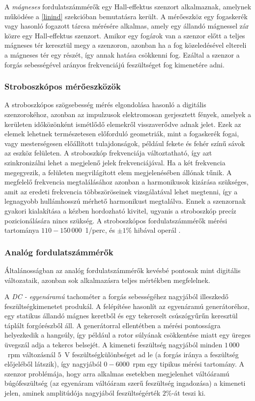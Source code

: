 A \textit{mágneses} fordulatszámmérők egy Hall-effektus szenzort alkalmaznak, amelynek működése a \ref{linind} szekcióban bemutatásra került. A mérőeszköz egy fogaskerék vagy hasonló fogazott tárcsa mérésére alkalmas, amely egy állandó mágnessel zár közre egy Hall-effektus szenzort. Amikor egy fogárok van a szenzor előtt a teljes mágneses tér keresztül megy a szenzoron, azonban ha a fog közeledésével eltereli a mágneses tér egy részét, így annak hatása csökkenni fog. Ezáltal a szenzor a forgás sebességével arányos frekvenciájú feszültséget fog kimenetére adni.

\subsubsection{Stroboszkópos mérőeszközök}

A stroboszkópos szögsebesség mérés elgondolása hasonló a digitális szenzorokéhoz, azonban az impulzusok elektromosan gerjesztett fények, amelyek a kerületen időközönként ismétlődő elemekről visszaverődve adnak jelet. Ezek az elemek lehetnek természetesen előforduló geometriák, mint a fogaskerék fogai, vagy mesterségesen előállított tulajdonságok, például fekete és fehér színű sávok az eszköz felületen. A stroboszkóp frekvenciája változtatható, így azt szinkronizálni lehet a megjelenő jelek frekvenciájával. Ha a két frekvencia megegyezik, a felületen megvilágított elem megjelenésében állónak tűnik. A megfelelő frekvencia megtalálásához azonban a harmonikusok kizárása szükséges, amit az eredeti frekvencia többszöröseinek vizsgálatával lehet megtenni, így a legnagyobb hullámhosszú mérhető harmonikust megtalálva. Ennek a szenzornak gyakori kialakítása a kézben hordozható kivitel, ugyanis a stroboszkóp precíz pozicionálására nincs szükség. A stroboszkópos fordulatszámmérők mérési tartománya $110 - 150\,000$~1/perc, és $\pm1\%$ hibával operál \cite{Morris2016b}.

\subsubsection{Analóg fordulatszámmérők}

Általánosságban az analóg fordulatszámmérők kevésbé pontosak mint digitális változataik, azonban sok alkalmazásra teljes mértékben megfelelnek.

A \textit{DC - egyenáramú} tachométer a forgás sebességéhez nagyjából illeszkedő feszültségkimenetet produkál. A felépítése hasonlít az egyenáramú generátoréhoz, egy statikus állandó mágnes keretből és egy tekercselt csúszógyűrűn keresztül táplált forgórészből áll. A generátorral ellentétben a mérési pontosságra helyezkedik a hangsúly, így például a rotor súlyának csökkentése miatt egy üreges üvegszál adja a tekercs belsejét. A kimeneti feszültség nagyjából minden $1\,000$~rpm változásnál $5$~V feszültségkülönbséget ad le (a forgás iránya a feszültség előjeléből látszik), így nagyjából $0-6000$~rpm egy tipikus mérési tartomány. A szenzor problémája, hogy arra alkalmas esetekben megjelenhet váltóáramú búgófeszültség (az egyenáram váltóáram szerű feszültség ingadozása) a kimeneti jelen, aminek amplitúdója nagyjából feszültségérték $2\%$-át teszi ki.

